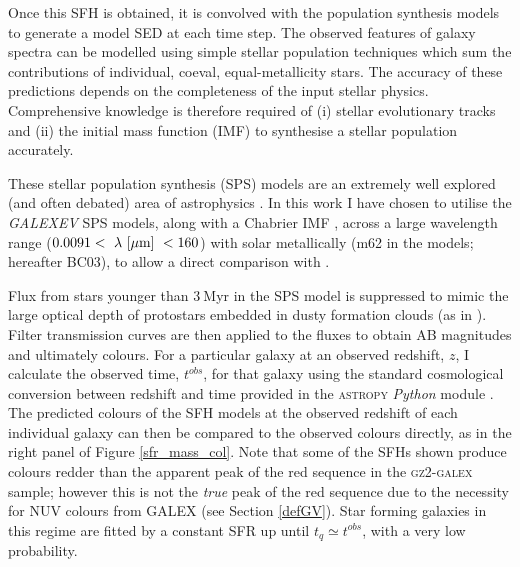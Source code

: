 Once this SFH is obtained, it is convolved with the \citet{BC03} population synthesis models to generate a model SED at each time step. The observed features of galaxy spectra can be modelled using simple stellar population techniques which sum the contributions of individual, coeval, equal-metallicity stars. The accuracy of these predictions depends on the completeness of the input stellar physics. Comprehensive knowledge is therefore required of (i) stellar evolutionary tracks and (ii) the initial mass function (IMF) to synthesise a stellar population accurately. 

These stellar population synthesis (SPS) models are an extremely well explored (and often debated) area of astrophysics \citep{Maraston05, Eminian08, CGW09, falkenberg09, chen10, kriek10, miner11, melbourne12}. In this work I have chosen to utilise the \citet{BC03} \emph{GALEXEV} SPS models, along with a Chabrier IMF \citep{chabrier03}, across a large wavelength range ($0.0091 < ~\lambda~\rm{[\mu m]}~ < 160 $) with solar metallically (m62 in the \citet{BC03} models; hereafter BC03), to allow a direct comparison with \citet{schawinski14}.


Flux from stars younger than $3~$Myr in the SPS model is suppressed to mimic the large optical depth of protostars embedded in dusty formation clouds (as in \citealt{schawinski14}).  Filter transmission curves are then applied to the fluxes to obtain AB magnitudes and ultimately colours.  For a particular galaxy at an observed redshift, $z$, I calculate the observed time, $t^{obs}$, for that galaxy using the standard cosmological conversion between redshift and time provided in the \textsc{astropy} {\em Python} module \citep{astropy13}. The predicted colours of the SFH models at the observed redshift of each individual galaxy can then be compared to the observed colours directly, as in the right panel of Figure \ref{sfr_mass_col}. Note that some of the SFHs shown produce colours redder than the apparent peak of the red sequence in the \textsc{gz2-galex} sample; however this is not the \emph{true} peak of the red sequence due to the necessity for NUV colours from GALEX (see Section \ref{defGV}). Star forming galaxies in this regime are fitted by a constant SFR up until $t_q \simeq t^{obs}$, with a very low probability.


